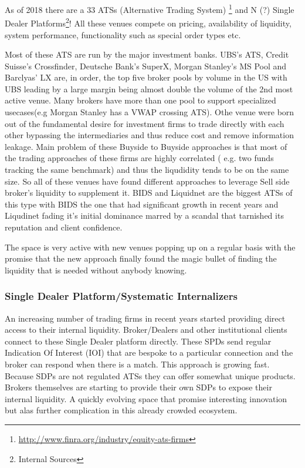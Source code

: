 As of 2018 there are a 33 ATSs (Alternative Trading System) \footnote{\url{http://www.finra.org/industry/equity-ats-firms}} and N (?) Single Dealer Platforms\footnote{Internal Sources}!  All these venues compete on pricing, availability of liquidity, system performance, functionality such as special order types etc. 

Most of these ATS are run by the major investment banks. UBS's ATS, Credit Suisse's Crossfinder, Deutsche Bank's SuperX, Morgan Stanley's MS Pool and Barclyas' LX are, in order,  the top five broker pools by volume in the US with UBS leading by a large margin being almost double the volume of the 2nd most active venue. Many brokers have more than one pool to support specialized usecases(e.g Morgan Stanley has a VWAP crossing ATS). Othe venue were born out of the fundamental desire for investment firms to trade directly with each other bypassing the intermediaries and  thus reduce cost and remove information leakage. Main problem of these Buyside to Buyside approaches is that most of the trading approaches of these firms are highly correlated ( e.g. two funds tracking the same benchmark) and thus the liqudidity tends to be on the same size. So all of these venues have found different approaches to leverage Sell side broker's liquidity to supplement it. BIDS and Liquidnet  are the biggest ATSs of this type with BIDS the one that had significant growth in recent years and Liqudinet fading it's initial dominance marred by a scandal that tarnished its reputation and client confidence. 

The space is very active with new venues popping up on a regular basis with the promise that the new approach finally found the magic bullet of finding the liquidity that is needed without anybody knowing.

\subsubsection{Single Dealer Platform/Systematic Internalizers}
An increasing number of trading firms in recent years started providing direct access to their internal liquidity. Broker/Dealers and other institutional clients connect to these Single Dealer platform directly. These SPDs send regular Indication Of Interest (IOI)  that are bespoke to a particular connection and the broker can respond when there is a match. This approach is growing fast. Because SDPs are not regulated ATSs they can offer somewhat unique products. Brokers themselves are starting to provide their own SDPs to expose their internal liquidity. A quickly evolving space that promise interesting innovation but alas further complication in this already crowded ecosystem.

